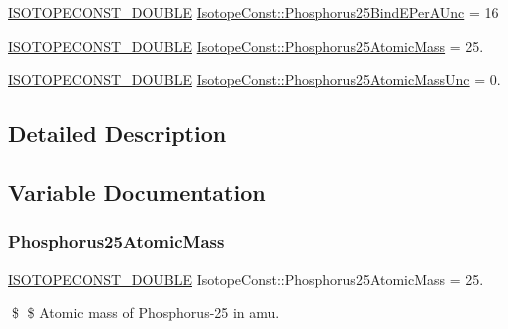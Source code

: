 \begin{DoxyCompactItemize}
\mbox{\hyperlink{group___isotope_const-_macros_ga8f45a7272ce02c0b4c65c44636ed719a}{I\+S\+O\+T\+O\+P\+E\+C\+O\+N\+S\+T\+\_\+\+D\+O\+U\+B\+LE}} \mbox{\hyperlink{group___isotope_const-_phosphorus-_p25_gaf347b3342e4a2a626bf43e845e16ee38}{Isotope\+Const\+::\+Phosphorus25\+Bind\+E\+Per\+A\+Unc}} = 16
\item 
\mbox{\hyperlink{group___isotope_const-_macros_ga8f45a7272ce02c0b4c65c44636ed719a}{I\+S\+O\+T\+O\+P\+E\+C\+O\+N\+S\+T\+\_\+\+D\+O\+U\+B\+LE}} \mbox{\hyperlink{group___isotope_const-_phosphorus-_p25_gae1944a7a07234b2c9fff621f2b180cf4}{Isotope\+Const\+::\+Phosphorus25\+Atomic\+Mass}} = 25.
\item 
\mbox{\hyperlink{group___isotope_const-_macros_ga8f45a7272ce02c0b4c65c44636ed719a}{I\+S\+O\+T\+O\+P\+E\+C\+O\+N\+S\+T\+\_\+\+D\+O\+U\+B\+LE}} \mbox{\hyperlink{group___isotope_const-_phosphorus-_p25_ga68c85d7cce4f99edff3246f7d400e730}{Isotope\+Const\+::\+Phosphorus25\+Atomic\+Mass\+Unc}} = 0.
\end{DoxyCompactItemize}


\subsection{Detailed Description}


\subsection{Variable Documentation}
\mbox{\label{group___isotope_const-_phosphorus-_p25_gae1944a7a07234b2c9fff621f2b180cf4}} 
\subsubsection{\texorpdfstring{Phosphorus25\+Atomic\+Mass}{Phosphorus25AtomicMass}}
{\footnotesize\ttfamily \mbox{\hyperlink{group___isotope_const-_macros_ga8f45a7272ce02c0b4c65c44636ed719a}{I\+S\+O\+T\+O\+P\+E\+C\+O\+N\+S\+T\+\_\+\+D\+O\+U\+B\+LE}} Isotope\+Const\+::\+Phosphorus25\+Atomic\+Mass = 25.}

\$ \$ Atomic mass of Phosphorus-\/25 in amu. \mbox{\label{group___isotope_const-_phosphorus-_p25_ga68c85d7cce4f99edff3246f7d400e730}} 
